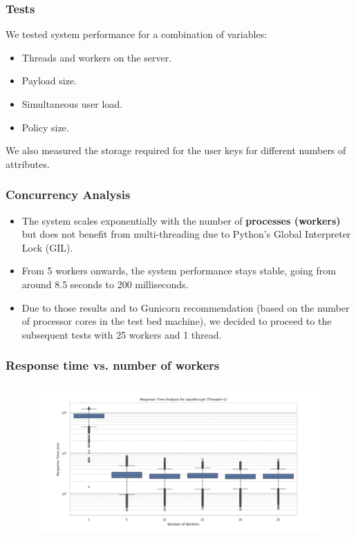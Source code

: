 \documentclass{beamer}
\begin{document}
\begin{frame}
\frametitle{Tests}
We tested system performance for a combination of variables:
\begin{itemize}
\item Threads and workers on the server.
\item Payload size.
\item Simultaneous user load.
\item Policy size.
\end{itemize}

We also measured the storage required for the user keys for different numbers of attributes.
\end{frame}

\begin{frame}
\frametitle{Concurrency Analysis}
\begin{itemize}
\item The system scales exponentially with the number of \textbf{processes (workers)} but does not benefit from multi-threading due to Python's Global Interpreter Lock (GIL).
\item From 5 workers onwards, the system performance stays stable, going from around 8.5 seconds to 200 milliseconds.
\item Due to those results and to Gunicorn recommendation (based on the number of processor cores in the test bed machine), we decided to proceed to the subsequent tests with 25 workers and 1 thread.
\end{itemize}
\end{frame}

\begin{frame}
\frametitle{Response time vs. number of workers}
\begin{figure}
\includegraphics[width=\textwidth,height=0.7\textheight,keepaspectratio]{images/phase1/api_decrypt/response_time_threads_1.png}
\end{figure}
\end{frame}
\end{document}
